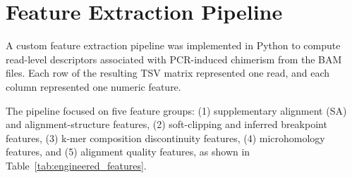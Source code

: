 \section{Feature Extraction Pipeline}

A custom feature extraction pipeline was implemented in Python to compute read-level descriptors associated with PCR-induced chimerism from the BAM files. Each row of the resulting TSV matrix represented one read, and each column represented one numeric feature.

The pipeline focused on five feature groups: (1) supplementary alignment (SA) and alignment-structure features, (2) soft-clipping and inferred breakpoint features, (3) k-mer composition discontinuity features, (4) microhomology features, and (5) alignment quality features, as shown in Table~\ref{tab:engineered_features}.

\begingroup

\small

\renewcommand{\arraystretch}{1.18}

\setlength{\extrarowheight}{2pt}


